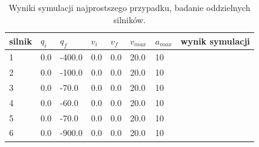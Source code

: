\documentclass[a4paper, 12pt]{article}
\begin{document}
	\begin{table}[H]
	\centering
	\begin{tabular}{|m{2.5em}|m{4em}|m{4em}|m{4em}|m{4em}|m{4em}|m{4em}|m{5em}|}
	\hline
	silnik&$ q_i $ & $ q_f $ & $ v_i $ & $ v_f $ & $ v_{max} $ & $ a_{max} $&wynik symulacji\\
	\hline
	\hline
	\hspace{1em}1& 0.0 & -400.0 & 0.0 & 0.0 & 20.0 & 10&\hspace{2em}\checkmark\\ %
	\hline
	\hspace{1em}2& 0.0 & -100.0 & 0.0 & 0.0 & 20.0 & 10&\hspace{2em}\checkmark\\ %
	\hline
	\hspace{1em}3& 0.0 & -70.0 & 0.0 & 0.0 & 20.0 & 10&\hspace{2em}\checkmark\\ %
	\hline
	\hspace{1em}4& 0.0 & -60.0 & 0.0 & 0.0 & 20.0 & 10&\hspace{2em}\checkmark\\  %
	\hline
	\hspace{1em}5& 0.0 & -70.0 & 0.0 & 0.0 & 20.0 & 10&\hspace{2em}\checkmark\\  %
	\hline
	\hspace{1em}6& 0.0 & -900.0 & 0.0 & 0.0 & 20.0 & 10&\hspace{2em}\checkmark\\  %
	\hline
	\end{tabular}
	\caption{Wyniki symulacji najprostszego przypadku, badanie oddzielnych silników.}
	\label{tab:setup8}
	\end{table}
\end{document}
